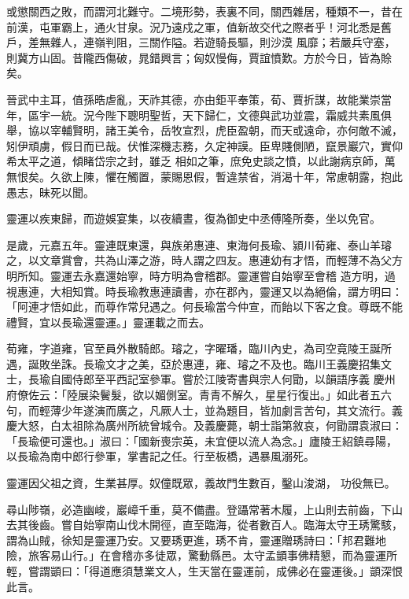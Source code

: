 \begin{pinyinscope}
 或懲關西之敗，而謂河北難守。二境形勢，表裏不同，關西雜居，種類不一，昔在前漢，屯軍霸上，通火甘泉。況乃遠戍之軍，值新故交代之際者乎！河北悉是舊戶，差無雜人，連嶺判阻，三關作隘。若遊騎長驅，則沙漠
 風靡；若嚴兵守塞，則冀方山固。昔隴西傷破，晁錯興言；匈奴慢侮，賈誼憤歎。方於今日，皆為賒矣。



 晉武中主耳，值孫晧虐亂，天祚其德，亦由鉅平奉策，荀、賈折謀，故能業崇當年，區宇一統。況今陛下聰明聖哲，天下歸仁，文德與武功並震，霜威共素風俱舉，協以宰輔賢明，諸王美令，岳牧宣烈，虎臣盈朝，而天或遠命，亦何敵不滅，矧伊頑虜，假日而已哉。伏惟深機志務，久定神謨。臣卑賤側陋，竄景巖穴，實仰希太平之道，傾睹岱宗之封，雖乏
 相如之筆，庶免史談之憤，以此謝病京師，萬無恨矣。久欲上陳，懼在觸置，蒙賜恩假，暫違禁省，消渴十年，常慮朝露，抱此愚志，昧死以聞。



 靈運以疾東歸，而遊娛宴集，以夜續晝，復為御史中丞傅隆所奏，坐以免官。



 是歲，元嘉五年。靈連既東還，與族弟惠連、東海何長瑜、潁川荀雍、泰山羊璿之，以文章賞會，共為山澤之游，時人謂之四友。惠連幼有才悟，而輕薄不為父方明所知。靈運去永嘉還始寧，時方明為會稽郡。靈運嘗自始寧至會稽
 造方明，過視惠連，大相知賞。時長瑜教惠連讀書，亦在郡內，靈運又以為絕倫，謂方明曰：「阿連才悟如此，而尊作常兒遇之。何長瑜當今仲宣，而飴以下客之食。尊既不能禮賢，宜以長瑜還靈運。」靈運載之而去。



 荀雍，字道雍，官至員外散騎郎。璿之，字曜璠，臨川內史，為司空竟陵王誕所遇，誕敗坐誅。長瑜文才之美，亞於惠連，雍、璿之不及也。臨川王義慶招集文士，長瑜自國侍郎至平西記室參軍。嘗於江陵寄書與宗人何勖，以韻語序義
 慶州府僚佐云：「陸展染鬢髮，欲以媚側室。青青不解久，星星行復出。」如此者五六句，而輕薄少年遂演而廣之，凡厥人士，並為題目，皆加劇言苦句，其文流行。義慶大怒，白太祖除為廣州所統曾城令。及義慶薨，朝士詣第敘哀，何勖謂袁淑曰：「長瑜便可還也。」淑曰：「國新喪宗英，未宜便以流人為念。」廬陵王紹鎮尋陽，以長瑜為南中郎行參軍，掌書記之任。行至板橋，遇暴風溺死。



 靈運因父祖之資，生業甚厚。奴僮既眾，義故門生數百，鑿山浚湖，
 功役無已。



 尋山陟嶺，必造幽峻，巖嶂千重，莫不備盡。登躡常著木履，上山則去前齒，下山去其後齒。嘗自始寧南山伐木開徑，直至臨海，從者數百人。臨海太守王琇驚駭，謂為山賊，徐知是靈運乃安。又要琇更進，琇不肯，靈運贈琇詩曰：「邦君難地險，旅客易山行。」在會稽亦多徒眾，驚動縣邑。太守孟顗事佛精懇，而為靈運所輕，嘗謂顗曰：「得道應須慧業文人，生天當在靈運前，成佛必在靈運後。」顗深恨此言。




\end{pinyinscope}
